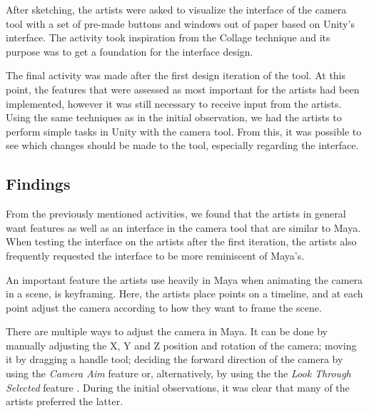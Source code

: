 After sketching, the artists were asked to visualize the interface of the camera tool with a set of pre-made buttons and windows out of paper based on Unity's interface. The activity took inspiration from the Collage technique \cite{part_design} and its purpose was to get a foundation for the interface design.

The final activity was made after the first design iteration of the tool. At this point, the features that were assessed as most important for the artists had been implemented, however it was still necessary to receive input from the artists. Using the same techniques as in the initial observation, we had the artists to perform simple tasks in Unity with the camera tool. From this, it was possible to see which changes should be made to the tool, especially regarding the interface.

\subsection{Findings}
From the previously mentioned activities, we found that the artists in general want features as well as an interface in the camera tool that are similar to Maya. When testing the interface on the artists after the first iteration, the artists also frequently requested the interface to be more reminiscent of Maya's.

An important feature the artists use heavily in Maya when animating the camera in a scene, is keyframing. Here, the artists place points on a timeline, and at each point adjust the camera according to how they want to frame the scene.

There are multiple ways to adjust the camera in Maya. It can be done by manually adjusting the X, Y and Z position and rotation of the camera; moving it by dragging a handle tool; deciding the forward direction of the camera by using the \textit{Camera Aim} feature \cite{maya_camAim} or, alternatively, by using the the \textit{Look Through Selected} feature \cite{maya_lookThrough}. During the initial observations, it was clear that many of the artists preferred the latter.

